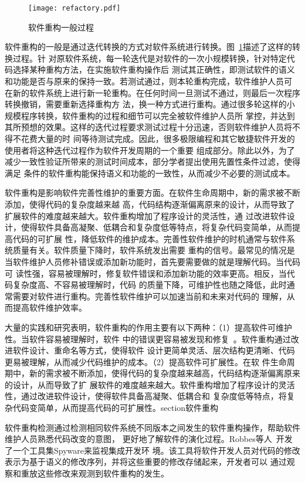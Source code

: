 \begin{figure}
  \centering
  \texttt{[image: refactory.pdf]}  
  \caption{\label{fig:refactory}软件重构一般过程}
\end{figure}

软件重构的一般是通过迭代转换的方式对软件系统进行转换。图~\ref{fig:refactory}描述了这样的转换过程。针
对原软件系统，每一轮迭代是对软件的一次小规模转换，针对特定代码选择某种重构方法，在实施软件重构操作后
测试其正确性，即测试软件的语义和功能是否与原来的保持一致。若测试通过，则本轮重构完成，软件维护人员可
在新的软件系统上进行新一轮重构。在任何时间一旦测试不通过，则最后一次程序转换撤销，需要重新选择重构方
法，换一种方式进行重构。通过很多轮这样的小规模程序转换，软件重构的过程和细节可以完全被软件维护人员所
掌控，并达到其所预想的效果。这样的迭代过程要求测试过程十分迅速，否则软件维护人员将不得不花费大量的时
间等待测试完成。因此，很多极限编程和其它敏捷软件开发的使用者将这种迭代过程作为软件开发周期的一个重要
组成部分。除此以外，为了减少一致性验证所带来的测试时间成本，部分学者提出使用先置性条件过滤，使得满足
条件的软件重构能保持语义和功能的一致性，从而减少不必要的测试成本。

软件重构是影响软件完善性维护的重要方面。在软件生命周期中，新的需求被不断添加，使得代码的复杂度越来越
高，代码结构逐渐偏离原来的设计，从而导致了扩展软件的难度越来越大。软件重构增加了程序设计的灵活性，通
过改进软件设计，使得软件具备高凝聚、低耦合和复杂度低等特点，将复杂代码变简单，从而提高代码的可扩展
性，降低软件的维护成本。完善性软件维护的时机通常与软件系统质量有关。软件质量下降时，软件系统发出需要
重构的信号。最常见的情况是当软件维护人员修补错误或添加新功能时，首先要需要做的就是理解代码。当代码可
读性强，容易被理解时，修复软件错误和添加新功能的效率更高。相反，当代码复杂度高、不容易被理解时，代码
的质量下降，可维护性也随之降低，此时通常需要对软件进行重构。完善性软件维护可以加速当前和未来对代码的
理解，从而提高软件维护效率。

大量的实践和研究表明，软件重构的作用主要有以下两种：（1）提高软件可维护性。当软件容易被理解时，软件
中的错误更容易被发现和修复~\cite{martin2009clean}。软件重构通过改进软件设计、重命名等方式，使得软件
设计更简单灵活、层次结构更清晰、代码更易被理解，从而减少代码维护的成本。（2）提高软件可扩展性。在软
件生命周期中，新的需求被不断添加，使得代码的复杂度越来越高，代码结构逐渐偏离原来的设计，从而导致了扩
展软件的难度越来越大。软件重构增加了程序设计的灵活性，通过改进软件设计，使得软件具备高凝聚、低耦合和
复杂度低等特点，将复杂代码变简单，从而提高代码的可扩展性。section{软件重构}

软件重构检测通过检测相同软件系统不同版本之间发生的软件重构操作，帮助软件维护人员熟悉代码改变的意图，
更好地了解软件的演化过程。Robbes等人~\cite{robbes2008spyware}开发了一个工具集Spyware来监视集成开发环
境。该工具将软件开发人员对代码的修改表示为基于语义的修改序列，并将这些重要的修改存储起来，开发者可以
通过观察和重放这些修改来观测到软件重构的发生。

